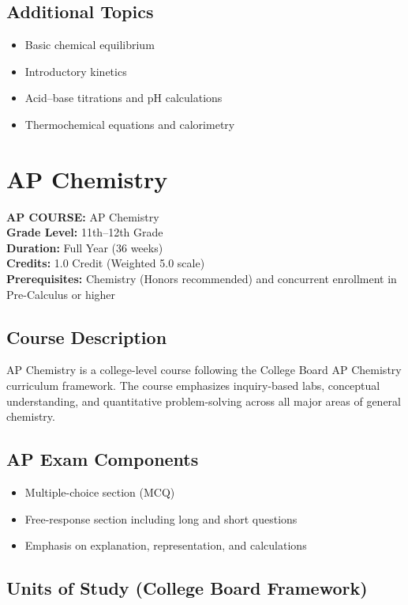 \documentclass[12pt,oneside]{book}
\begin{document}
\section{Additional Topics}
\begin{itemize}[leftmargin=2em]
    \item Basic chemical equilibrium
    \item Introductory kinetics
    \item Acid--base titrations and pH calculations
    \item Thermochemical equations and calorimetry
\end{itemize}

\chapter{AP Chemistry}

\noindent\textbf{AP COURSE:} AP Chemistry\\
\textbf{Grade Level:} 11th--12th Grade\\
\textbf{Duration:} Full Year (36 weeks)\\
\textbf{Credits:} 1.0 Credit (Weighted 5.0 scale)\\
\textbf{Prerequisites:} Chemistry (Honors recommended) and concurrent enrollment in Pre-Calculus or higher

\section{Course Description}
AP Chemistry is a college-level course following the College Board AP Chemistry curriculum
framework. The course emphasizes inquiry-based labs, conceptual understanding, and quantitative
problem-solving across all major areas of general chemistry.

\section{AP Exam Components}
\begin{itemize}[leftmargin=2em]
    \item Multiple-choice section (MCQ)
    \item Free-response section including long and short questions
    \item Emphasis on explanation, representation, and calculations
\end{itemize}

\section{Units of Study (College Board Framework)}
\end{document}

